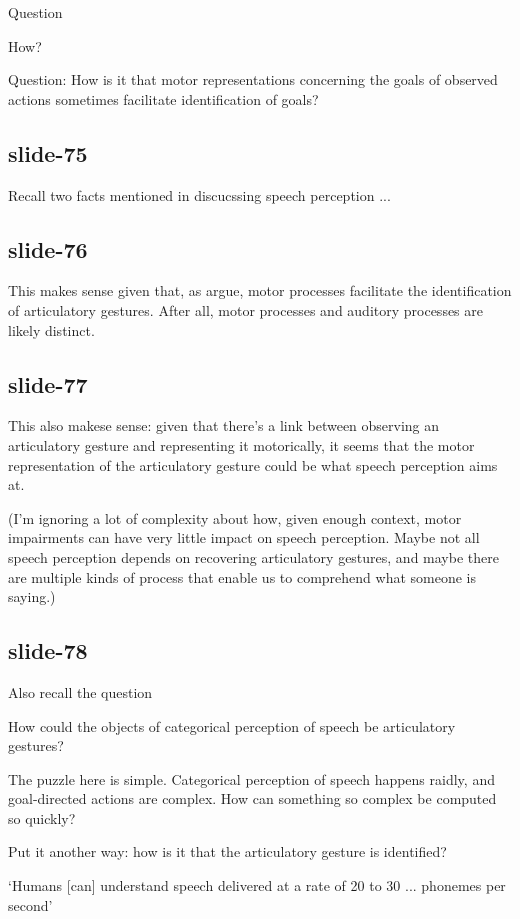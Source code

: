 \documentclass[12pt,\papersize]{extarticle}
\begin{document}
Question



 How?




Question: How is it that motor representations concerning the goals of observed actions sometimes facilitate identification of goals?

\subsection{slide-75}
Recall two facts mentioned in discucssing speech perception ...

\subsection{slide-76}
This makes sense given that, as \citet{dausilio:2009_motor} argue,
motor processes facilitate the identification of articulatory gestures.
After all, motor processes and auditory processes are likely distinct.

\subsection{slide-77}
This also makese sense: given that there’s a link between observing an
articulatory gesture and representing it motorically, it seems that the
motor representation of the articulatory gesture could be what speech
perception aims at.

(I’m ignoring a lot of complexity about how, given enough context,
motor impairments can have very little impact on speech perception.
Maybe not all speech perception depends on recovering articulatory gestures,
and maybe there are multiple kinds of process that enable us to comprehend
what someone is saying.)

\subsection{slide-78}
Also recall the question

How could the objects of categorical perception of speech be articulatory gestures?

The puzzle here is simple.
Categorical perception of speech happens raidly, and goal-directed actions
are complex.  How can something so complex be computed so quickly?

Put it another way: how is it that the articulatory gesture is identified?

‘Humans [can] understand speech delivered at a rate of 20 to 30 ... phonemes per second’
\citep{Devlin:2006qg}
\end{document}
